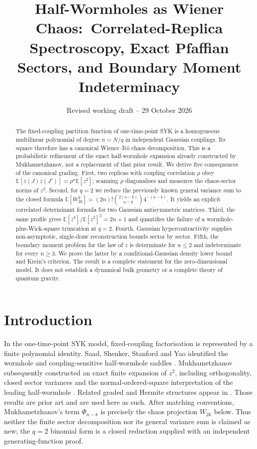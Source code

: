 \documentclass[11pt,a4paper]{article}
\title{\textbf{Half-Wormholes as Wiener Chaos:\ Correlated-Replica Spectroscopy, Exact Pfaffian Sectors, and Boundary Moment Indeterminacy}}
\author{}
\date{Revised working draft -- 29 October 2026}
\theoremstyle{definition}
\theoremstyle{remark}
\newcommand{\E}{\mathbb{E}}
\begin{document}
\maketitle

\begin{abstract}
The fixed-coupling partition function of one-time-point SYK is a homogeneous multilinear
polynomial of degree $n=N/q$ in independent Gaussian couplings.  Its square therefore has
a canonical Wiener--It\^o chaos decomposition.  This is a probabilistic refinement of the
exact half-wormhole expansion already constructed by Mukhametzhanov, not a replacement of
that prior result.  We derive five consequences of the canonical grading.  First, two
replicas with coupling correlation $\rho$ obey
$\E[z(J)z(J')]=\rho^n\E[z^2]$; scanning $\rho$ diagonalises and measures the chaos-sector
norms of $z^2$.  Second, for $q=2$ we reduce the previously known general variance sum to the closed formula
$\E[W_{2k}^2]=(2n)!\binom{2(n-k)}{n-k}4^{-(n-k)}$.  It yields an explicit correlated
determinant formula for two Gaussian antisymmetric matrices.  Third, the same profile gives
$\E[z^4]/\E[z^2]^2=2n+1$ and quantifies the failure of a wormhole-plus-Wick-square
truncation at $q=2$.  Fourth, Gaussian hypercontractivity supplies non-asymptotic,
single-draw reconstruction bounds sector by sector.  Fifth, the boundary moment problem for
the law of $z$ is determinate for $n\le2$ and indeterminate for every $n\ge3$.  We prove the
latter by a conditional-Gaussian density lower bound and Krein's criterion.  The result is a
complete statement for the zero-dimensional model.  It does not establish a dynamical bulk
geometry or a complete theory of quantum gravity.
\end{abstract}

\section{Introduction}

In the one-time-point SYK model, fixed-coupling factorisation is represented by a finite
polynomial identity.  Saad, Shenker, Stanford and Yao identified the wormhole and
coupling-sensitive half-wormhole saddles \citep{SaadEtAl2024}.  Mukhametzhanov subsequently
constructed an exact finite expansion of $z^2$, including orthogonality, closed sector
variances and the normal-ordered-square interpretation of the leading half-wormhole
\citep{Mukhametzhanov2022}.  Related graded and Hermite structures appear in
\citet{TianYang2022}.  Those results are prior art and are used here as such.
After matching conventions, Mukhametzhanov's term $\Phi_{n-k}$ is precisely the chaos
projection $W_{2k}$ below.  Thus neither the finite sector decomposition nor its general
variance sum is claimed as new; the $q=2$ binomial form is a closed reduction supplied with
an independent generating-function proof.
\end{document}
